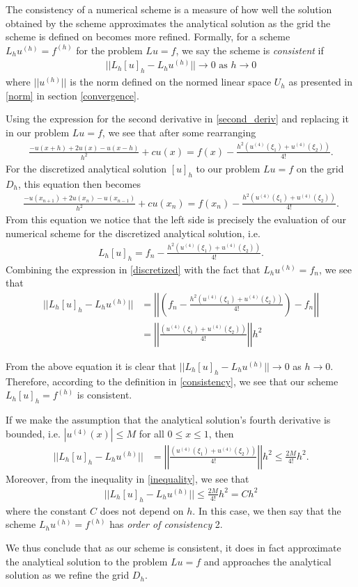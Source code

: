 The consistency of a numerical scheme is a measure of how well the solution
obtained by the scheme approximates the analytical solution as the grid
the scheme is defined on becomes more refined. Formally,
for a scheme $L_h u^{(h)} = f^{(h)}$ for the problem $Lu = f$, we say the
scheme is \textit{consistent} if
\begin{align}\label{consistency}
  ||L_h[u]_h - L_h u^{(h)}|| \to 0 \text{\ as $h \to 0$}
\end{align}
where $|| u^{(h)} ||$ is the norm defined on the normed linear space $U_h$ as
presented in \eqref{norm} in section \ref{convergence}.

Using the expression for the second
derivative in \eqref{second_deriv} and replacing it in our problem $Lu = f$, we
see that after some rearranging
\begin{align*}
  \frac{-u(x + h) + 2u(x) - u(x-h)}{h^2} + cu(x) = f(x) - \frac{h^2(u^{(4)}(\xi_1) + u^{(4)}(\xi_2))}{4!}.
\end{align*}
For the discretized analytical solution $[u]_h$ to our problem $Lu = f$ on the grid $D_h$,
this equation then becomes
\begin{align*}
  \frac{-u(x_{n+1}) + 2u(x_n) - u(x_{n-1})}{h^2} + cu(x_n) = f(x_n) - \frac{h^2(u^{(4)}(\xi_1) + u^{(4)}(\xi_2))}{4!}.
\end{align*}
From this equation we notice that the left side is precisely the evaluation
of our numerical scheme for the discretized analytical solution, i.e.
\begin{align}\label{discretized}
  L_h[u]_h = f_n - \frac{h^2(u^{(4)}(\xi_1) + u^{(4)}(\xi_2))}{4!}.
\end{align}
Combining the expression in \eqref{discretized} with the fact that
$L_hu^{(h)} = f_n$, we see that
\begin{align*}
  ||L_h[u]_h - L_hu^{(h)}||
  &= \left|\left| \left(f_n - \frac{h^2(u^{(4)}(\xi_1) + u^{(4)}(\xi_2))}{4!}\right) - f_n \right|\right| \\
  &= \left|\left| \frac{(u^{(4)}(\xi_1) + u^{(4)}(\xi_2))}{4!}\right|\right| h^2
\end{align*}

From the above equation it is clear that $||L_h[u]_h - L_hu^{(h)}|| \to 0$ as $h \to 0$.
Therefore, according to the definition in \eqref{consistency}, we see that
our scheme $L_h[u]_h = f^{(h)}$ is consistent.

If we make the assumption that the analytical solution's fourth derivative
is bounded, i.e. $|u^{(4)}(x)| \leq M$ for all $0 \leq x \leq 1$, then
\begin{align}\label{inequality}
  ||L_h[u]_h - L_hu^{(h)}||
  &= \left|\left| \frac{(u^{(4)}(\xi_1) + u^{(4)}(\xi_2))}{4!}\right|\right| h^2 \leq \frac{2M}{4!}h^2.
\end{align}
Moreover, from the inequality in \eqref{inequality}, we see that
\begin{align}\label{order}
  ||L_h[u]_h - L_hu^{(h)}|| \leq \frac{2M}{4!}h^2 = Ch^2
\end{align}
where the constant $C$ does not depend on $h$. In this case, we then say that
the scheme $L_h u^{(h)} = f^{(h)}$ has \textit{order of consistency} 2.

We thus conclude that as our scheme is consistent, it does in fact approximate
the analytical solution to the problem $Lu = f$ and approaches the analytical
solution as we refine the grid $D_h$.
